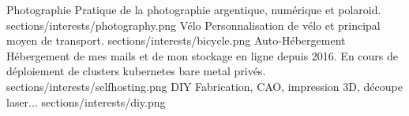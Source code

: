 \interest%
{Photographie}%
{Pratique de la photographie argentique, numérique et polaroid.}%
{sections/interests/photography.png}%
\interest%
{Vélo}%
{Personnalisation de vélo et principal moyen de transport.}%
{sections/interests/bicycle.png}%
\interest%
{Auto-Hébergement}%
{Hébergement de mes mails et de mon stockage en ligne depuis 2016. En cours de
déploiement de clusters kubernetes bare metal privés.}%
{sections/interests/selfhosting.png}%
\interest%
{DIY}%
{Fabrication, CAO, impression 3D, découpe laser...}%
{sections/interests/diy.png}%
